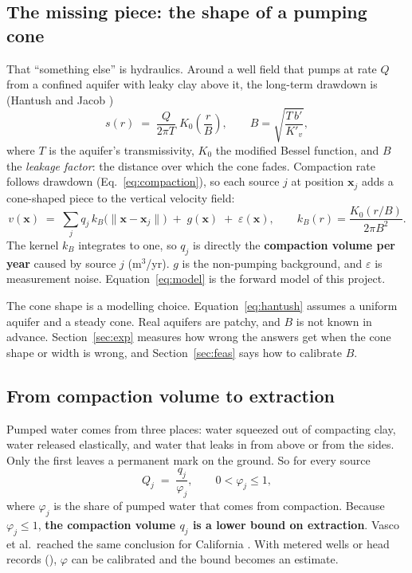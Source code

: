 \subsection{The missing piece: the shape of a pumping cone}

That ``something else'' is hydraulics. Around a well field that pumps at rate $Q$ from a confined
aquifer with leaky clay above it, the long-term drawdown is (Hantush and Jacob \cite{hantush1955})
\begin{equation}
s(r) \;=\; \frac{Q}{2\pi T}\;K_0\!\left(\frac{r}{B}\right), \qquad B=\sqrt{\frac{T\,b'}{K'_v}} ,
\label{eq:hantush}
\end{equation}
where $T$ is the aquifer's transmissivity, $K_0$ the modified Bessel function, and $B$ the
\emph{leakage factor}: the distance over which the cone fades. Compaction rate follows drawdown
(Eq.~\ref{eq:compaction}), so each source $j$ at position $\mathbf{x}_j$ adds a cone-shaped piece to
the vertical velocity field:
\begin{equation}
v(\mathbf{x}) \;=\; \sum_{j} q_j\,k_B\big(\lVert\mathbf{x}-\mathbf{x}_j\rVert\big) \;+\; g(\mathbf{x}) \;+\; \varepsilon(\mathbf{x}),
\qquad k_B(r)=\frac{K_0(r/B)}{2\pi B^2}.
\label{eq:model}
\end{equation}
The kernel $k_B$ integrates to one, so $q_j$ is directly the \textbf{compaction volume per year}
caused by source $j$ (m$^3$/yr). $g$ is the non-pumping background, and $\varepsilon$ is measurement
noise. Equation~\eqref{eq:model} is the forward model of this project.

\begin{caution}
The cone shape is a modelling choice. Equation~\eqref{eq:hantush} assumes a uniform aquifer and a
steady cone. Real aquifers are patchy, and $B$ is not known in advance. Section~\ref{sec:exp} measures
how wrong the answers get when the cone shape or width is wrong, and Section~\ref{sec:feas} says how
to calibrate $B$.
\end{caution}

\subsection{From compaction volume to extraction}\label{sec:massbalance}

Pumped water comes from three places: water squeezed out of compacting clay, water released
elastically, and water that leaks in from above or from the sides. Only the first leaves a permanent
mark on the ground. So for every source
\begin{equation}
Q_j \;=\; \frac{q_j}{\varphi_j}, \qquad 0<\varphi_j\le 1 ,
\label{eq:phi}
\end{equation}
where $\varphi_j$ is the share of pumped water that comes from compaction. Because
$\varphi_j \le 1$, \textbf{the compaction volume $q_j$ is a lower bound on extraction}. Vasco et
al.\ reached the same conclusion for California \cite{vasco2019}. With metered wells or head records
(), $\varphi$ can be calibrated and the bound becomes an estimate.

